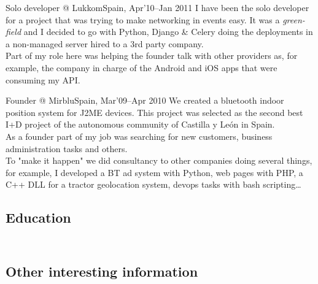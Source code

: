 \documentclass[11pt, a4paper, sans]{moderncv}
\begin{document}
\cventry{}{}
{Solo developer @ Lukkom}{Spain, Apr'10--Jan 2011}
{}
{\vspace{-1em}I have been the solo developer for a project that was trying to make networking in events easy. It was a \textit{green-field} and I decided to go with Python, Django \& Celery doing the deployments in a non-managed server hired to a 3rd party company.\\
Part of my role here was helping the founder talk with other providers as, for example, the company in charge of the Android and iOS apps that were consuming my API.\\}

\cventry{}{}
{Founder @ Mirblu}{Spain, Mar'09--Apr 2010}
{}
{\vspace{-1em}We created a bluetooth indoor position system for J2ME devices. This project was selected as the second best I+D project of the autonomous community of Castilla y León in Spain.\\ As a founder part of my job was searching for new customers, business administration tasks and others.\\
To "make it happen" we did consultancy to other companies doing several things, for example, I developed a BT ad system with Python, web pages with PHP, a C++ DLL for a tractor geolocation system, devops tasks with bash scripting\ldots\\}


%
%

\subsection{Education}
\vspace{-1em}
\vspace{-1em}

%
%

\subsection{\\Other interesting information}
\end{document}
